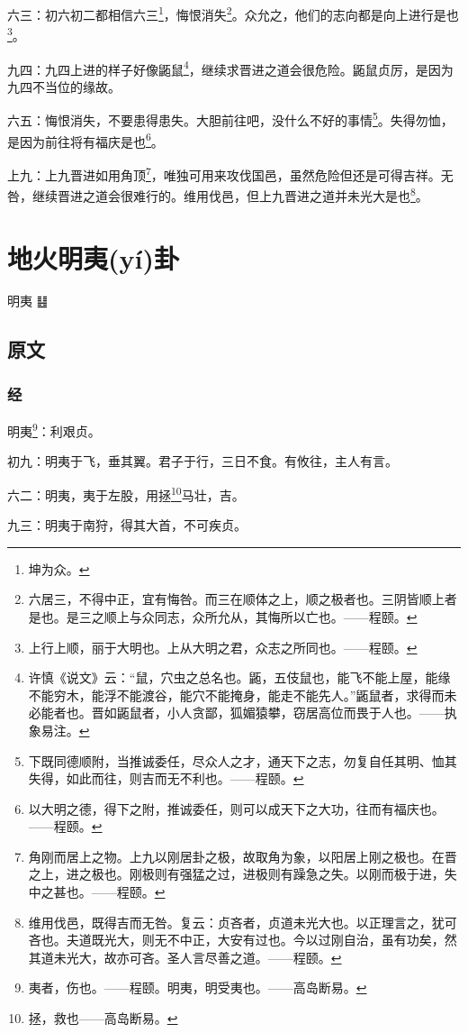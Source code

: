 \documentclass[12pt,oneside]{book}
\begin{document}
六三：初六初二都相信六三\footnote{坤为众。}，悔恨消失\footnote{六居三，不得中正，宜有悔咎。而三在顺体之上，顺之极者也。三阴皆顺上者是也。是三之顺上与众同志，众所允从，其悔所以亡也。——程颐。}。众允之，他们的志向都是向上进行是也\footnote{上行上顺，丽于大明也。上从大明之君，众志之所同也。——程颐。}。

九四：九四上进的样子好像鼫鼠\footnote{许慎《说文》云：“鼠，穴虫之总名也。鼫，五伎鼠也，能飞不能上屋，能缘不能穷木，能浮不能渡谷，能穴不能掩身，能走不能先人。”鼫鼠者，求得而未必能者也。晋如鼫鼠者，小人贪鄙，狐媚猿攀，窃居高位而畏于人也。——执象易注。}，继续求晋进之道会很危险。鼫鼠贞厉，是因为九四不当位的缘故。

六五：悔恨消失，不要患得患失。大胆前往吧，没什么不好的事情\footnote{下既同德顺附，当推诚委任，尽众人之才，通天下之志，勿复自任其明、恤其失得，如此而往，则吉而无不利也。——程颐。}。失得勿恤，是因为前往将有福庆是也\footnote{以大明之德，得下之附，推诚委任，则可以成天下之大功，往而有福庆也。——程颐。}。

上九：上九晋进如用角顶\footnote{角刚而居上之物。上九以刚居卦之极，故取角为象，以阳居上刚之极也。在晋之上，进之极也。刚极则有强猛之过，进极则有躁急之失。以刚而极于进，失中之甚也。——程颐。}，唯独可用来攻伐国邑，虽然危险但还是可得吉祥。无咎，继续晋进之道会很难行的。维用伐邑，但上九晋进之道并未光大是也\footnote{维用伐邑，既得吉而无咎。复云：贞吝者，贞道未光大也。以正理言之，犹可吝也。夫道既光大，则无不中正，大安有过也。今以过刚自治，虽有功矣，然其道未光大，故亦可吝。圣人言尽善之道。——程颐。}。




\chapter{地火明夷(yí)卦}
明夷 {\Large ䷣}

\section{原文}

\subsection{经}
明夷\footnote{夷者，伤也。——程颐。明夷，明受夷也。——高岛断易。}：利艰贞。

初九：明夷于飞，垂其翼。君子于行，三日不食。有攸往，主人有言。

六二：明夷，夷于左股，用拯\footnote{拯，救也——高岛断易。}马壮，吉。

九三：明夷于南狩，得其大首，不可疾贞。
\end{document}
